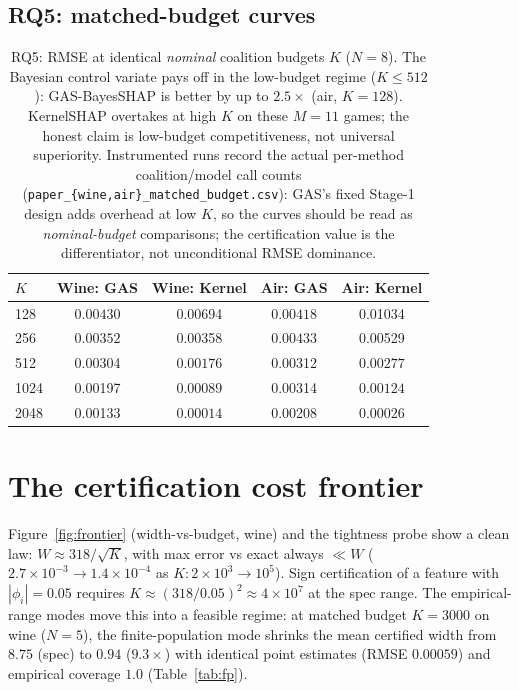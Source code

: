 \documentclass[11pt,twocolumn]{article}
\begin{document}
\subsection{RQ5: matched-budget curves}\label{sec:rq5}
\begin{table}[t]\centering\small
\begin{tabular}{lcc|cc}
\toprule
$K$ & Wine: GAS & Wine: Kernel & Air: GAS & Air: Kernel \\
\midrule
128  & $\mathbf{0.00430}$ & 0.00694 & $\mathbf{0.00418}$ & 0.01034 \\
256  & $\mathbf{0.00352}$ & 0.00358 & $\mathbf{0.00433}$ & 0.00529 \\
512  & 0.00304 & $\mathbf{0.00176}$ & 0.00312 & $\mathbf{0.00277}$ \\
1024 & 0.00197 & $\mathbf{0.00089}$ & 0.00314 & $\mathbf{0.00124}$ \\
2048 & 0.00133 & $\mathbf{0.00014}$ & 0.00208 & $\mathbf{0.00026}$ \\
\bottomrule
\end{tabular}
\caption{RQ5: RMSE at identical \emph{nominal} coalition budgets $K$ ($N{=}8$).  The
Bayesian control variate pays off in the low-budget regime ($K\le512$):
GAS-BayesSHAP is better by up to $2.5\times$ (air, $K{=}128$).  KernelSHAP
overtakes at high $K$ on these $M{=}11$ games; the honest claim is
low-budget competitiveness, not universal superiority.  Instrumented runs
record the actual per-method coalition/model call counts
(\texttt{paper\_\{wine,air\}\_matched\_budget.csv}): GAS's fixed Stage-1
design adds overhead at low $K$, so the curves should be read as
\emph{nominal-budget} comparisons; the certification value is the
differentiator, not unconditional RMSE dominance.}
\label{rq5}
\end{table}

\section{The certification cost frontier}\label{sec:frontier}
Figure~\ref{fig:frontier} (width-vs-budget, wine) and the tightness probe
show a clean law: $W\approx318/\sqrt K$, with max error vs exact always
$\ll W$ ($2.7\times10^{-3}\to1.4\times10^{-4}$ as
$K:2\times10^3\to10^5$).  Sign certification of a feature with
$|\phi_i|=0.05$ requires $K\approx(318/0.05)^2\approx4\times10^7$ at the
spec range.  The empirical-range modes move this into a feasible regime:
at matched budget $K=3000$ on wine ($N=5$), the finite-population mode
shrinks the mean certified width from $8.75$ (spec) to $0.94$ ($9.3\times$)
with identical point estimates (RMSE $0.00059$) and empirical coverage
$1.0$ (Table~\ref{tab:fp}).
\end{document}
